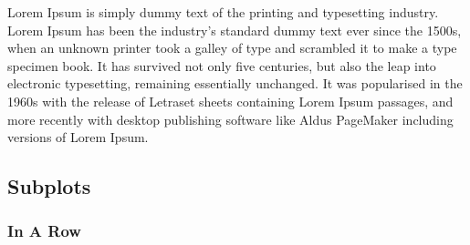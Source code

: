 \documentclass{article}
\begin{document}
Lorem Ipsum is simply dummy text of the printing and typesetting industry. Lorem Ipsum has been the industry's standard dummy text ever since the 1500s, when an unknown printer took a galley of type and scrambled it to make a type specimen book. It has survived not only five centuries, but also the leap into electronic typesetting, remaining essentially unchanged. It was popularised in the 1960s with the release of Letraset sheets containing Lorem Ipsum passages, and more recently with desktop publishing software like Aldus PageMaker including versions of Lorem Ipsum.

\pagebreak


\subsection{Subplots}
\subsubsection{In A Row}
\end{document}
